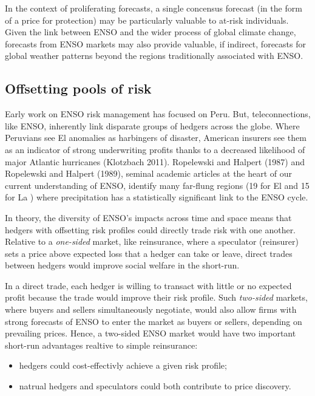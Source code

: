 \documentclass[article]{jss}
\begin{document}
In the context of proliferating forecasts, a single concensus forecast
(in the form of a price for protection) may be particularly valuable to
at-risk individuals. Given the link between ENSO and the wider process
of global climate change, forecasts from ENSO markets may also provide
valuable, if indirect, forecasts for global weather patterns beyond the
regions traditionally associated with ENSO.

\subsection{Offsetting pools of risk}\label{offsetting-pools-of-risk}

Early work on ENSO risk management has focused on Peru. But,
teleconnections, like ENSO, inherently link disparate groups of hedgers
across the globe. Where Peruvians see El  anomalies as
harbingers of disaster, American insurers see them as an indicator of
strong underwriting profits thanks to a decreased likelihood of major
Atlantic hurricanes (Klotzbach 2011). Ropelewski and Halpert (1987) and
Ropelewski and Halpert (1989), seminal academic articles at the heart of
our current understanding of ENSO, identify many far-flung regions (19
for El  and 15 for La ) where precipitation
has a statistically significant link to the ENSO cycle.

In theory, the diversity of ENSO's impacts across time and space means
that hedgers with offsetting risk profiles could directly trade risk
with one another. Relative to a \emph{one-sided} market, like
reinsurance, where a speculator (reinsurer) sets a price above expected
loss that a hedger can take or leave, direct trades between hedgers
would improve social welfare in the short-run.

In a direct trade, each hedger is willing to transact with little or no
expected profit because the trade would improve their risk profile. Such
\emph{two-sided} markets, where buyers and sellers simultaneously
negotiate, would also allow firms with strong forecasts of ENSO to enter
the market as buyers or sellers, depending on prevailing prices. Hence,
a two-sided ENSO market would have two important short-run advantages
realtive to simple reinsurance:

\begin{itemize}
\itemsep1pt\parskip0pt
\item
  hedgers could cost-effectivly achieve a given risk profile;
\item
  natrual hedgers and speculators could both contribute to price
  discovery.
\end{itemize}
\end{document}
